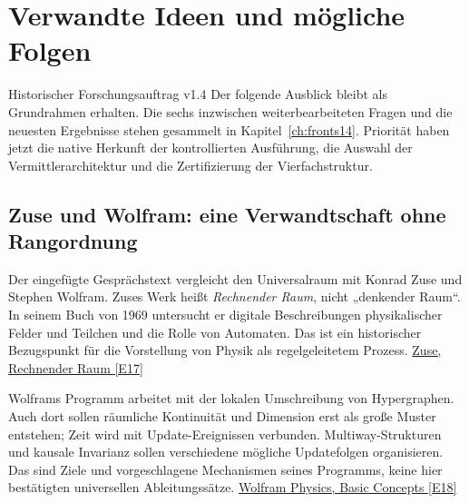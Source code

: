 \chapter{Verwandte Ideen und mögliche Folgen}
\begin{bild}{Historischer Forschungsauftrag v1.4}
Der folgende Ausblick bleibt als Grundrahmen erhalten. Die sechs inzwischen weiterbearbeiteten Fragen und die neuesten Ergebnisse stehen gesammelt in Kapitel~\ref{ch:fronts14}. Priorität haben jetzt die native Herkunft der kontrollierten Ausführung, die Auswahl der Vermittlerarchitektur und die Zertifizierung der Vierfachstruktur.
\end{bild}
\section{Zuse und Wolfram: eine Verwandtschaft ohne Rangordnung}
Der eingefügte Gesprächstext vergleicht den Universalraum mit Konrad Zuse und Stephen Wolfram. Zuses Werk heißt \emph{Rechnender Raum}, nicht „denkender Raum“. In seinem Buch von 1969 untersucht er digitale Beschreibungen physikalischer Felder und Teilchen und die Rolle von Automaten. Das ist ein historischer Bezugspunkt für die Vorstellung von Physik als regelgeleitetem Prozess. \href{https://link.springer.com/book/10.1007/978-3-663-02723-2}{Zuse, Rechnender Raum [E17]}

Wolframs Programm arbeitet mit der lokalen Umschreibung von Hypergraphen. Auch dort sollen räumliche Kontinuität und Dimension erst als große Muster entstehen; Zeit wird mit Update-Ereignissen verbunden. Multiway-Strukturen und kausale Invarianz sollen verschiedene mögliche Updatefolgen organisieren. Das sind Ziele und vorgeschlagene Mechanismen seines Programms, keine hier bestätigten universellen Ableitungssätze. \href{https://www.wolframphysics.org/technical-introduction/potential-relation-to-physics/basic-concepts/}{Wolfram Physics, Basic Concepts [E18]}

